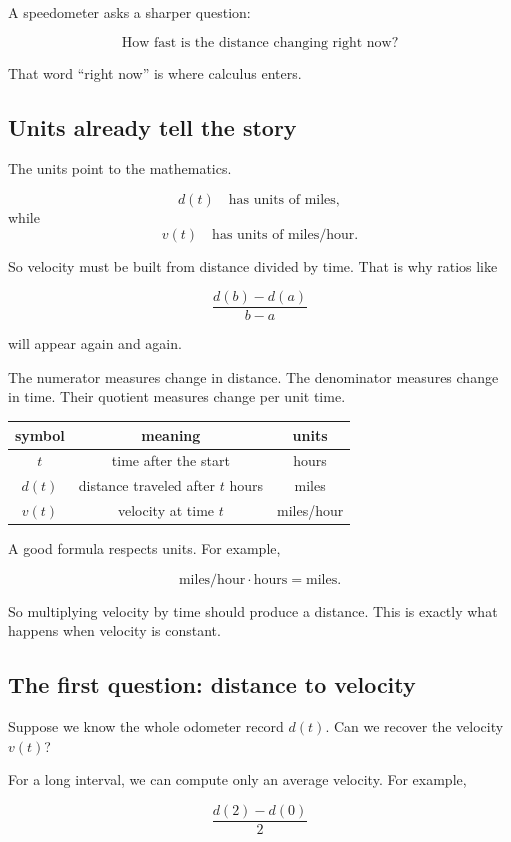 A speedometer asks a sharper question:

\[
\text{How fast is the distance changing right now?}
\]

That word ``right now'' is where calculus enters.

\subsection{Units already tell the story}

The units point to the mathematics.

\[
d(t) \quad \text{has units of miles},
\]
while
\[
v(t) \quad \text{has units of miles/hour}.
\]

So velocity must be built from distance divided by time. That is why ratios like

\[
\frac{d(b)-d(a)}{b-a}
\]

will appear again and again.

The numerator measures change in distance. The denominator measures change in time. Their quotient measures change per unit time.

\begin{center}
\begin{tabular}{c|c|c}
\textbf{symbol} & \textbf{meaning} & \textbf{units} \\ \hline
\(t\) & time after the start & hours \\
\(d(t)\) & distance traveled after \(t\) hours & miles \\
\(v(t)\) & velocity at time \(t\) & miles/hour
\end{tabular}
\end{center}

A good formula respects units. For example,

\[
\text{miles/hour}\cdot \text{hours}=\text{miles}.
\]

So multiplying velocity by time should produce a distance. This is exactly what happens when velocity is constant.

\subsection{The first question: distance to velocity}

Suppose we know the whole odometer record \(d(t)\). Can we recover the velocity \(v(t)\)?

For a long interval, we can compute only an average velocity. For example,

\[
\frac{d(2)-d(0)}{2}
\]

